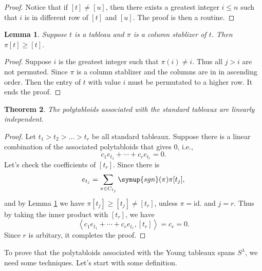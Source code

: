 \documentclass{assignment}[2019/10/15]
\newcommand{\lr}[3]{\left#1#3\right#2}
\theoremstyle{plain}
\newtheorem{theorem}{Theorem}[section]
\newtheorem{lemma}[theorem]{Lemma}
\newcommand{\sgn}{\mathop{}\!\symup{sgn}}
\newcommand{\id}{\text{id.}}
\numberwithin{equation}{section}
\begin{document}
    \begin{proof}
        Notice that if $[t]\neq [u]$, then there exists a greatest integer $i\leq n$ such that $i$ is in different row of $[t]$ and $[u]$. The proof is then a routine.
    \end{proof}

    \begin{lemma}\label{lem: leq}
        Suppose $t$ is a tableau and $\pi$ is a column stablizer of $t$. Then $\pi [t]\geq [t]$.
    \end{lemma}

    \begin{proof}
        Suppose $i$ is the greatest integer such that $\pi (i)\neq i$. Thus all $j>i$ are not permuted. Since $\pi$ is a column stablizer and the columns are in in ascending order. Then the entry of $t$ with value $i$ must be permutated to a higher row. It ends the proof.
    \end{proof}

    \begin{theorem}
        The polytabloids associated with the standard tableaux are linearly independent.
    \end{theorem}

    \begin{proof}
        Let $t_1> t_2 > \dotsc > t_r$ be all standard tableaux. Suppose there is a linear combination of the associated polytabloids that gives 0, i.e.,
        \begin{equation}
            c_1e_{t_1}+\dotsb + c_re_{t_r}=0.
        \end{equation}
        Let's check the coefficients of $[t_r]$. Since there is
        \begin{equation}
            e_{t_j} = \sum_{\pi\in C_{t_j}}\sgn(\pi)\pi[t_j],
        \end{equation}
        and by Lemma \ref{lem: leq} we have $\pi[t_j]\geq[t_j]\neq [t_r]$, unless $\pi=\id$ and $j=r$. Thus by taking the inner product with $[t_r]$, we have
        \begin{equation}
            \lr<>{c_1e_{t_1}+\dotsb + c_re_{t_r}, [t_r]} = c_r = 0.
        \end{equation}
        Since $r$ is arbitary, it completes the proof.
    \end{proof}

    To prove that the polytabloids associated with the Young tableaux spans $S^\lambda$, we need some techniques. Let's start with some definition.
\end{document}
